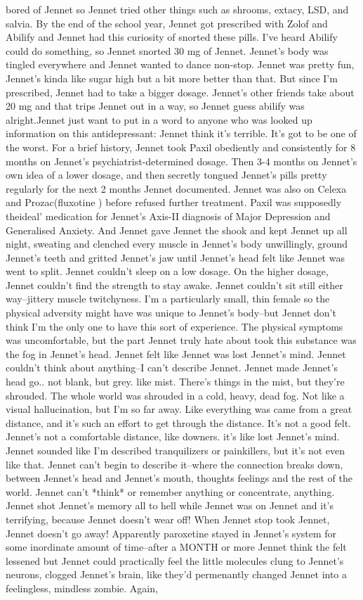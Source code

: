 \documentclass[12pt]{book}
\begin{document}
bored of Jennet so Jennet tried other things such as shrooms, extacy, LSD, and salvia. By the end of the school year, Jennet got prescribed with Zolof and Abilify and Jennet had this curiosity of snorted these pills. I've heard Abilify could do something, so Jennet snorted 30 mg of Jennet. Jennet's body was tingled everywhere and Jennet wanted to dance non-stop. Jennet was pretty fun, Jennet's kinda like sugar high but a bit more better than that. But since I'm prescribed, Jennet had to take a bigger dosage. Jennet's other friends take about 20 mg and that trips Jennet out in a way, so Jennet guess abilify was alright.Jennet just want to put in a word to anyone who was looked up information on this antidepressant: Jennet think it's terrible. It's got to be one of the worst. For a brief history, Jennet took Paxil obediently and consistently for 8 months on Jennet's psychiatrist-determined dosage. Then 3-4 months on Jennet's own idea of a lower dosage, and then secretly tongued Jennet's pills pretty regularly for the next 2 months Jennet documented. Jennet was also on Celexa and Prozac(fluxotine ) before refused further treatment. Paxil was supposedly theideal' medication for Jennet's Axis-II diagnosis of Major Depression and Generalised Anxiety. And Jennet gave Jennet the shook and kept Jennet up all night, sweating and clenched every muscle in Jennet's body unwillingly, ground Jennet's teeth and gritted Jennet's jaw until Jennet's head felt like Jennet was went to split. Jennet couldn't sleep on a low dosage. On the higher dosage, Jennet couldn't find the strength to stay awake. Jennet couldn't sit still either way--jittery muscle twitchyness. I'm a particularly small, thin female so the physical adversity might have was unique to Jennet's body--but Jennet don't think I'm the only one to have this sort of experience. The physical symptoms was uncomfortable, but the part Jennet truly hate about took this substance was the fog in Jennet's head. Jennet felt like Jennet was lost Jennet's mind. Jennet couldn't think about anything--I can't describe Jennet. Jennet made Jennet's head go.. not blank, but grey. like mist. There's things in the mist, but they're shrouded. The whole world was shrouded in a cold, heavy, dead fog. Not like a visual hallucination, but I'm so far away. Like everything was came from a great distance, and it's such an effort to get through the distance. It's not a good felt. Jennet's not a comfortable distance, like downers. it's like lost Jennet's mind. Jennet sounded like I'm described tranquilizers or painkillers, but it's not even like that. Jennet can't begin to describe it--where the connection breaks down, between Jennet's head and Jennet's mouth, thoughts feelings and the rest of the world. Jennet can't *think* or remember anything or concentrate, anything. Jennet shot Jennet's memory all to hell while Jennet was on Jennet and it's terrifying, because Jennet doesn't wear off! When Jennet stop took Jennet, Jennet doesn't go away! Apparently paroxetine stayed in Jennet's system for some inordinate amount of time--after a MONTH or more Jennet think the felt lessened but Jennet could practically feel the little molecules clung to Jennet's neurons, clogged Jennet's brain, like they'd permenantly changed Jennet into a feelingless, mindless zombie. Again, 
\end{document}
